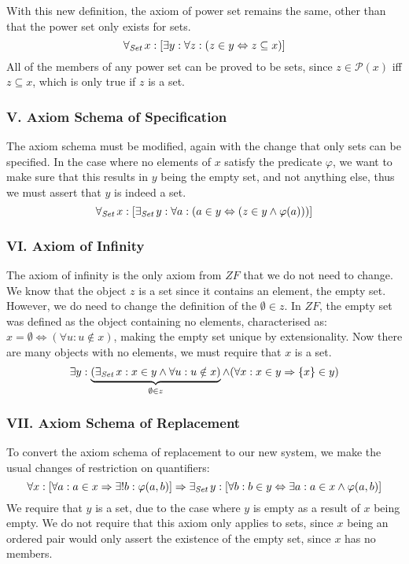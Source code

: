 \documentclass[11pt]{report}
\newcommand{\all}[1]{\forall_{\mathit{#1}}\hspace{0.5mm}}
\newcommand{\ex}[1]{\exists_{\mathit{#1}}\hspace{0.5mm}}
\theoremstyle{definition}
\theoremstyle{theorem}
\theoremstyle{lemma}
\begin{document}
\noindent
With this new definition, the axiom of power set remains the same, other than that the power set only exists for sets.
$$\all{Set}x: [\exists y:\forall z:
    (z\in y \Leftrightarrow z\subseteq x)]$$
All of the members of any power set can be proved to be sets, since $z\in \mathcal{P}(x)$ iff $z\subseteq x$, which is only true if $z$ is a set.

\subsubsection*{V. Axiom Schema of Specification}
The axiom schema must be modified, again with the change that only sets can be specified. In the case where no elements of $x$ satisfy the predicate $\varphi$, we want to make sure that this results in $y$ being the empty set, and not anything else, thus we must assert that $y$ is indeed a set.
$$\all{Set}x: [\ex{Set} y:\forall a:
    (a\in y \Leftrightarrow (z\in y \wedge \varphi(a)))]$$

\subsubsection*{VI. Axiom of Infinity}
The axiom of infinity is the only axiom from $\mathit{ZF}$ that we do not need to change. We know that the object $z$ is a set since it contains an element, the empty set. However, we do need to change the definition of the $\emptyset \in z$. In $\mathit{ZF}$, the empty set was defined as the object containing no elements, characterised as: $x = \emptyset \iff (\forall u: u\notin x)$, making the empty set unique by extensionality.
Now there are many objects with no elements, we must require that $x$ is a set.
$$\exists y: \underbrace
                {(\ex{Set}x:x\in y \wedge\forall u:u\notin x)}
                _{{\emptyset\in z}}
                \wedge (\forall x: x\in y \Rightarrow \{x\}\in y)$$

\subsubsection*{VII. Axiom Schema of Replacement}
To convert the axiom schema of replacement to our new system, we make the usual changes of restriction on quantifiers:
$$\forall x: [\forall a: a\in x \Rightarrow \exists!b: \varphi(a,b)]
  \Rightarrow \ex{Set} y:[\forall b: b\in y \Leftrightarrow
                                     \exists a: a\in x \wedge\varphi(a,b)]$$
We require that $y$ is a set, due to the case where $y$ is empty as a result of $x$ being empty.
We do not require that this axiom only applies to sets, since $x$ being an ordered pair would only assert the existence of the empty set, since $x$ has no members.
\end{document}
